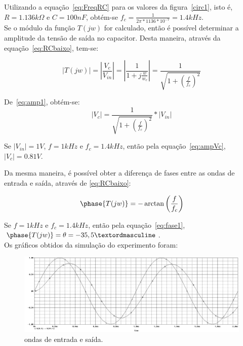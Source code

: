 \documentclass[12pt, a4paper]{article}
\begin{document}
\begin{enumerate}
            Utilizando a equação~\ref{eq:FreqRC} para os valores da figura~\ref{circ1}, isto é, \( R = 1.136k\Omega\) e \(C = 100nF\), obtém-se \(f_c = \frac{1}{2\pi*1136*10^{-7}}=1.4kHz\).\\
            Se o módulo da função \(T(jw)\) for calculado, então é possível determinar a amplitude da tensão de saída no capacitor. Desta maneira, através da equação~\ref{eq:RCbaixo}, tem-se:
            
            \begin{equation} \label{eq:amp1}
            \left|T(jw)\right| = \left|\frac{V_c}{V_{in}}\right| = \left|\frac{1}{1+j\frac{w}{w_c}}\right| = \frac{1}{\sqrt{1+(\frac{f}{f_c})^2}}
            \end{equation}
            
            De~\ref{eq:amp1}, obtém-se:
            \begin{equation} \label{eq:ampVc}
            \left|V_c\right| = \frac{1}{\sqrt{1+(\frac{f}{f_c})^2}}*\left|V_{in}\right|
            \end{equation}
            
            Se \(\left|V_{in}\right| = 1V\), \(f=1kHz\) e \(f_c=1.4kHz\), então pela equação~\ref{eq:ampVc}, \(\left|V_{c}\right| = 0.81V\).
            
            Da mesma maneira, é possível obter a diferença de fases entre as ondas de entrada e saída, através de \ref{eq:RCbaixo}:
            
            \begin{equation} \label{eq:fase1}
            \phase{T(jw)} = -\arctan{\left(\frac{f}{f_c}\right)}
            \end{equation}
            
            Se \(f=1kHz\) e \(f_c=1.4kHz\), então pela equação~\ref{eq:fase1}, \(\phase{T(jw)} = \theta = -35,5º\). \\
            
            Os gráficos obtidos da simulação do experimento foram:
            
            \begin{figure}[h!] 
                \centering
                \includegraphics[width=1\textwidth]{waves1}
                \caption{ondas de entrada e saída.}        
                \label{waves1}
            \end{figure}
            

\end{enumerate}
\end{document}
